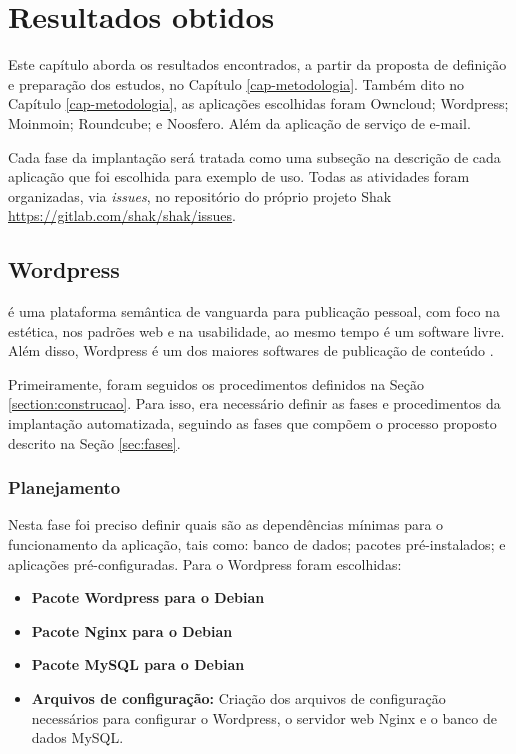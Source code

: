 \chapter{Resultados obtidos}
\label{cap-resultados}
Este capítulo aborda os resultados encontrados, a partir da proposta de
definição e preparação dos estudos, no Capítulo \ref{cap-metodologia}. Também dito 
no Capítulo \ref{cap-metodologia}, as aplicações escolhidas foram  
Owncloud; Wordpress; Moinmoin; Roundcube; e Noosfero. Além da aplicação de serviço
de e-mail.
 
Cada fase da implantação será tratada como uma 
subseção na descrição de cada aplicação que foi escolhida para exemplo de uso. 
Todas as atividades foram organizadas,
via \textit{issues}, no repositório do próprio projeto Shak 
\url{https://gitlab.com/shak/shak/issues}.

\section{Wordpress}
\label{sub:wordpress}

 é uma plataforma semântica de vanguarda para publicação pessoal, 
com foco na estética, nos padrões web e na usabilidade, ao mesmo tempo é 
um software livre. Além disso, Wordpress é um dos maiores softwares de 
publicação de conteúdo . 

Primeiramente, foram seguidos os procedimentos definidos na Seção 
\ref{section:construcao}. Para isso, era
necessário definir as fases e procedimentos da implantação automatizada,
seguindo as fases que compõem o processo proposto descrito na Seção \ref{sec:fases}.

\subsection{Planejamento}

Nesta fase foi preciso definir quais são as dependências mínimas
para o funcionamento da aplicação, tais como: banco de dados; pacotes
pré-instalados; e aplicações pré-configuradas. Para o Wordpress foram escolhidas:

\begin{itemize}
   \item \textbf{Pacote Wordpress para o Debian} 
   \item \textbf{Pacote Nginx para o Debian} 
   \item \textbf{Pacote MySQL para o Debian}
   \item \textbf{Arquivos de configuração:} Criação dos arquivos de configuração
   necessários para configurar o Wordpress, o servidor web Nginx e o banco de dados
   MySQL.
\end{itemize}

